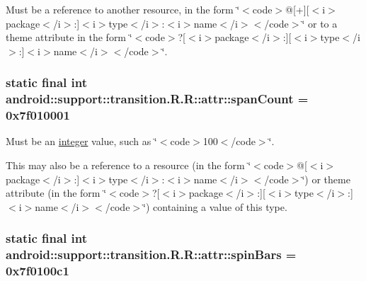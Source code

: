 Must be a reference to another resource, in the form \char`\"{}$<$code$>$@\mbox{[}+\mbox{]}\mbox{[}$<$i$>$package$<$/i$>$:\mbox{]}$<$i$>$type$<$/i$>$:$<$i$>$name$<$/i$>$$<$/code$>$\char`\"{} or to a theme attribute in the form \char`\"{}$<$code$>$?\mbox{[}$<$i$>$package$<$/i$>$:\mbox{]}\mbox{[}$<$i$>$type$<$/i$>$:\mbox{]}$<$i$>$name$<$/i$>$$<$/code$>$\char`\"{}. \hypertarget{classandroid_1_1support_1_1transition_1_1_r_1_1attr_3680637cf69658b63889964f48ec793d}{
\subsubsection[{spanCount}]{\setlength{\rightskip}{0pt plus 5cm}static final int android::support::transition.R.R::attr::spanCount = 0x7f010001}}
\label{classandroid_1_1support_1_1transition_1_1_r_1_1attr_3680637cf69658b63889964f48ec793d}


Must be an \hyperlink{classandroid_1_1support_1_1transition_1_1_r_1_1integer}{integer} value, such as \char`\"{}$<$code$>$100$<$/code$>$\char`\"{}. 

This may also be a reference to a resource (in the form \char`\"{}$<$code$>$@\mbox{[}$<$i$>$package$<$/i$>$:\mbox{]}$<$i$>$type$<$/i$>$:$<$i$>$name$<$/i$>$$<$/code$>$\char`\"{}) or theme attribute (in the form \char`\"{}$<$code$>$?\mbox{[}$<$i$>$package$<$/i$>$:\mbox{]}\mbox{[}$<$i$>$type$<$/i$>$:\mbox{]}$<$i$>$name$<$/i$>$$<$/code$>$\char`\"{}) containing a value of this type. \hypertarget{classandroid_1_1support_1_1transition_1_1_r_1_1attr_6c56c3551f1649bddd844234f3e8ef32}{
\subsubsection[{spinBars}]{\setlength{\rightskip}{0pt plus 5cm}static final int android::support::transition.R.R::attr::spinBars = 0x7f0100c1}}
\label{classandroid_1_1support_1_1transition_1_1_r_1_1attr_6c56c3551f1649bddd844234f3e8ef32}


